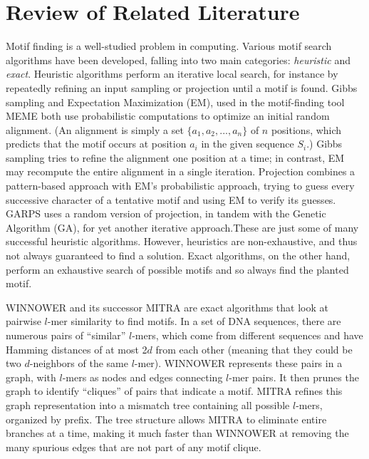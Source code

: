 \documentclass[conference]{IEEEtran}
\begin{document}
\section{Review of Related Literature}
	Motif finding is a well-studied problem in computing. Various motif search algorithms have been developed, falling into two main categories: \emph{heuristic} and \emph{exact}.
	Heuristic algorithms perform an iterative local search, for instance by repeatedly refining an input sampling or projection until a motif is found. Gibbs sampling \cite{lawrence1993detecting} and Expectation Maximization (EM), used in the motif-finding tool MEME \cite{lawrence1990expectation,bailey1995unsupervised} both use probabilistic computations to optimize an initial random alignment. (An alignment is simply a set $\{a_{1}, a_{2},...,a_{n}\}$ of $n$ positions, which predicts that the motif occurs at position $a_{i}$ in the given sequence $S_{i}$.) Gibbs sampling tries to refine the alignment one position at a time; in contrast, EM may recompute the entire alignment in a single iteration. Projection \cite{blanchette2002discovery} combines a pattern-based approach with EM's probabilistic approach,  trying to guess every successive character of a tentative motif and using EM to verify its guesses. GARPS \cite{huo2009combining} uses a random version of projection, in tandem with the Genetic Algorithm (GA), for yet another iterative approach.These are just some of many successful heuristic algorithms. However, heuristics are non-exhaustive, and thus not always guaranteed to find a solution. Exact algorithms, on the other hand, perform an exhaustive search of possible motifs and so always find the planted motif. 

	WINNOWER \cite{pevzner2000combinatorial} and its successor MITRA \cite{eskin2002finding} are exact algorithms that look at pairwise $l$-mer similarity to find motifs. In a set of DNA sequences, there are numerous pairs of ``similar'' $l$-mers, which come from different sequences and have Hamming distances of at most 2$d$ from each other (meaning that they could be two $d$-neighbors of the same $l$-mer). WINNOWER represents these pairs in a graph, with $l$-mers as nodes and edges connecting $l$-mer pairs. It then prunes the graph to identify ``cliques'' of pairs that indicate a motif. MITRA refines this graph representation into a mismatch tree containing all possible $l$-mers, organized by prefix. The tree structure allows MITRA to eliminate entire branches at a time, making it much faster than WINNOWER at removing the many spurious edges that are not part of any motif clique.
\end{document}
